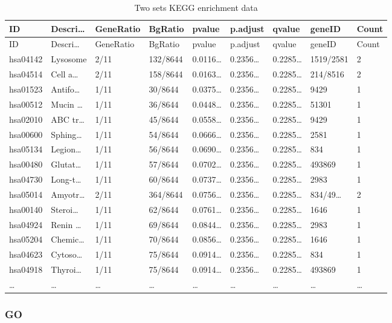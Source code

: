 \documentclass[
]{article}
\begin{document}
\begin{longtable}[]{@{}lllllllll@{}}
\caption{\label{tab:Two-sets-KEGG-enrichment-data}Two sets KEGG enrichment data}\tabularnewline
\toprule
ID & Descri\ldots{} & GeneRatio & BgRatio & pvalue & p.adjust & qvalue & geneID & Count\tabularnewline
\midrule
\endfirsthead
\toprule
ID & Descri\ldots{} & GeneRatio & BgRatio & pvalue & p.adjust & qvalue & geneID & Count\tabularnewline
\midrule
\endhead
hsa04142 & Lysosome & 2/11 & 132/8644 & 0.0116\ldots{} & 0.2356\ldots{} & 0.2285\ldots{} & 1519/2581 & 2\tabularnewline
hsa04514 & Cell a\ldots{} & 2/11 & 158/8644 & 0.0163\ldots{} & 0.2356\ldots{} & 0.2285\ldots{} & 214/8516 & 2\tabularnewline
hsa01523 & Antifo\ldots{} & 1/11 & 30/8644 & 0.0375\ldots{} & 0.2356\ldots{} & 0.2285\ldots{} & 9429 & 1\tabularnewline
hsa00512 & Mucin \ldots{} & 1/11 & 36/8644 & 0.0448\ldots{} & 0.2356\ldots{} & 0.2285\ldots{} & 51301 & 1\tabularnewline
hsa02010 & ABC tr\ldots{} & 1/11 & 45/8644 & 0.0558\ldots{} & 0.2356\ldots{} & 0.2285\ldots{} & 9429 & 1\tabularnewline
hsa00600 & Sphing\ldots{} & 1/11 & 54/8644 & 0.0666\ldots{} & 0.2356\ldots{} & 0.2285\ldots{} & 2581 & 1\tabularnewline
hsa05134 & Legion\ldots{} & 1/11 & 56/8644 & 0.0690\ldots{} & 0.2356\ldots{} & 0.2285\ldots{} & 834 & 1\tabularnewline
hsa00480 & Glutat\ldots{} & 1/11 & 57/8644 & 0.0702\ldots{} & 0.2356\ldots{} & 0.2285\ldots{} & 493869 & 1\tabularnewline
hsa04730 & Long-t\ldots{} & 1/11 & 60/8644 & 0.0737\ldots{} & 0.2356\ldots{} & 0.2285\ldots{} & 2983 & 1\tabularnewline
hsa05014 & Amyotr\ldots{} & 2/11 & 364/8644 & 0.0756\ldots{} & 0.2356\ldots{} & 0.2285\ldots{} & 834/49\ldots{} & 2\tabularnewline
hsa00140 & Steroi\ldots{} & 1/11 & 62/8644 & 0.0761\ldots{} & 0.2356\ldots{} & 0.2285\ldots{} & 1646 & 1\tabularnewline
hsa04924 & Renin \ldots{} & 1/11 & 69/8644 & 0.0844\ldots{} & 0.2356\ldots{} & 0.2285\ldots{} & 2983 & 1\tabularnewline
hsa05204 & Chemic\ldots{} & 1/11 & 70/8644 & 0.0856\ldots{} & 0.2356\ldots{} & 0.2285\ldots{} & 1646 & 1\tabularnewline
hsa04623 & Cytoso\ldots{} & 1/11 & 75/8644 & 0.0914\ldots{} & 0.2356\ldots{} & 0.2285\ldots{} & 834 & 1\tabularnewline
hsa04918 & Thyroi\ldots{} & 1/11 & 75/8644 & 0.0914\ldots{} & 0.2356\ldots{} & 0.2285\ldots{} & 493869 & 1\tabularnewline
\ldots{} & \ldots{} & \ldots{} & \ldots{} & \ldots{} & \ldots{} & \ldots{} & \ldots{} & \ldots{}\tabularnewline
\bottomrule
\end{longtable}

\hypertarget{go}{%
\subsubsection{GO}\label{go}}
\end{document}

